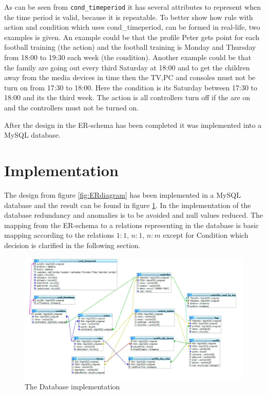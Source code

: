 As can be seen from \texttt{cond\_timeperiod} it has several attributes to represent when the time period is valid, because it is repeatable. To better show how rule with action and condition which uses cond\_timeperiod, can be formed in real-life, two examples is given.
 An example could be that the profile Peter gets point for each football training (the action) and the football training is Monday and Thursday from 18:00 to 19:30 each week (the condition). 
Another example could be that the family are going out every third Saturday at 18:00 and to get the children away from the media devices in time then the TV,PC and consoles must not be turn on from 17:30 to 18:00. Here the condition is its Saturday between 17:30 to 18:00 and its the third week. The action is all controllers turn off if the are on and the controllers must not be turned on. 

After the design in the ER-schema has been completed it was implemented into a MySQL database.  

\section{Implementation}

The design from figure \ref{fig:ERdiagram} has been implemented in a MySQL database and the result can be found in figure \ref{fig:databaseDiagram}. In the implementation of the database redundancy and anomalies is to be avoided and null values reduced. 
The mapping from the ER-schema to a relations representing in the database is basic mapping according to the relations $1:1$, $n:1$, $n:m$ except for Condition which decision is clarified in the following section. 

\begin{figure}
	\centering
		\includegraphics[width=1.00\textwidth]{images/databaseDiagram.jpg}
	\caption{The Database implementation}
	\label{fig:databaseDiagram}
\end{figure}

